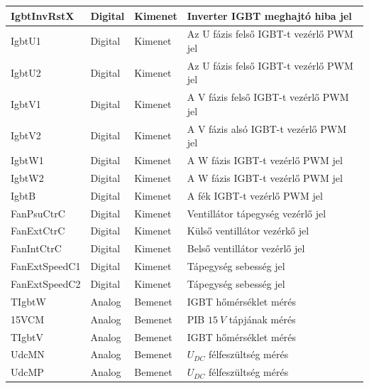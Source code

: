 \begin{table}[]
\begin{tabular}{|l|l|l|l|}
IgbtInvRstX    & Digital      & Kimenet      & Inverter IGBT meghajtó hiba jel                  \\ \hline
IgbtU1         & Digital      & Kimenet      & Az U fázis felső IGBT-t vezérlő PWM jel          \\ \hline
IgbtU2         & Digital      & Kimenet      & Az U fázis felső IGBT-t vezérlő PWM jel          \\ \hline
IgbtV1         & Digital      & Kimenet      & A V fázis felső IGBT-t vezérlő PWM jel           \\ \hline
IgbtV2         & Digital      & Kimenet      & A V fázis alsó IGBT-t vezérlő PWM jel            \\ \hline
IgbtW1         & Digital      & Kimenet      & A W fázis IGBT-t vezérlő PWM jel                 \\ \hline
IgbtW2         & Digital      & Kimenet      & A W fázis IGBT-t vezérlő PWM jel                 \\ \hline
IgbtB          & Digital      & Kimenet      & A fék IGBT-t vezérlő PWM jel                     \\ \hline
FanPsuCtrC     & Digital      & Kimenet      & Ventillátor tápegység vezérlő jel                \\ \hline
FanExtCtrC     & Digital      & Kimenet      & Külső ventillátor vezérkő jel                    \\ \hline
FanIntCtrC     & Digital      & Kimenet      & Belső ventillátor vezérlő jel                    \\ \hline
FanExtSpeedC1  & Digital      & Kimenet      & Tápegység sebesség jel                           \\ \hline
FanExtSpeedC2  & Digital      & Kimenet      & Tápegység sebesség jel                           \\ \hline
TIgbtW         & Analog       & Bemenet      & IGBT hőmérséklet mérés                           \\ \hline
15VCM          & Analog       & Bemenet      & PIB $15\ V$ tápjának mérés                       \\ \hline
TIgbtV         & Analog       & Bemenet      & IGBT hőmérséklet mérés                           \\ \hline
UdcMN          & Analog       & Bemenet      & $U_{DC}$ félfeszültség mérés                     \\ \hline
UdcMP          & Analog       & Bemenet      & $U_{DC}$ félfeszültség mérés                     \\ \hline

\end{tabular}
\end{table}
